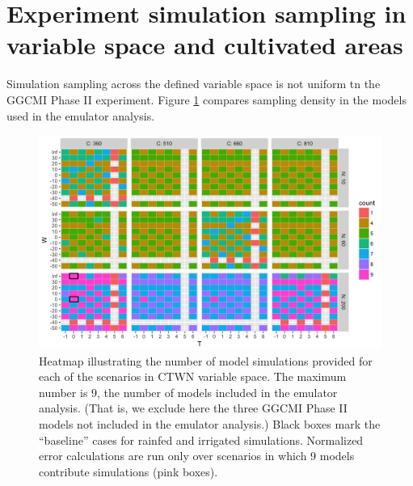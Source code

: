 \documentclass[12pt]{article}
\begin{document}
{\scriptsize \tableofcontents}

\clearpage

\renewcommand{\thefigure}{S\arabic{figure}}

\section{Experiment simulation sampling in variable space and cultivated areas}
\begin{flushleft}
	Simulation sampling across the defined variable space is not uniform tn the GGCMI Phase II experiment. 
  Figure \ref{fig:numbersims} compares sampling density in the models used in the emulator analysis. 
\end{flushleft}

\begin{figure}[h!]
  \centering
  \includegraphics[width=\textwidth]{s_how_many_simulations.png}
  \caption{
  Heatmap illustrating the number of model simulations provided for each of the scenarios in CTWN variable space. 
  The maximum number is 9, the number of models included in the emulator analysis. (That is, we exclude here the three GGCMI Phase II models not included in the emulator analysis.) 
  Black boxes mark the ``baseline'' cases for rainfed and irrigated simulations.
	Normalized error calculations are run only over scenarios in which 9 models contribute simulations (pink boxes).
  }
  \label{fig:numbersims}
\end{figure}
\end{document}
